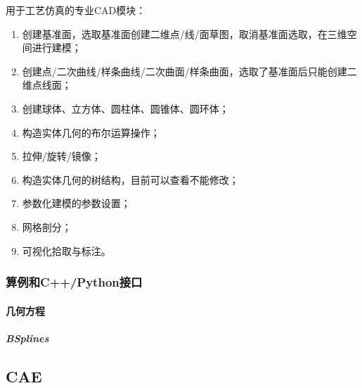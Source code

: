 \documentclass[letterpaper,10pt,english]{sphinxmanual}
\begin{document}
\sphinxAtStartPar
用于工艺仿真的专业CAD模块：
\begin{enumerate}
%
\item {} 
\sphinxAtStartPar
创建基准面，选取基准面创建二维点/线/面草图，取消基准面选取，在三维空间进行建模；

\item {} 
\sphinxAtStartPar
创建点/二次曲线/样条曲线/二次曲面/样条曲面，选取了基准面后只能创建二维点线面；

\item {} 
\sphinxAtStartPar
创建球体、立方体、圆柱体、圆锥体、圆环体；

\item {} 
\sphinxAtStartPar
构造实体几何的布尔运算操作；

\item {} 
\sphinxAtStartPar
拉伸/旋转/镜像；

\item {} 
\sphinxAtStartPar
构造实体几何的树结构，目前可以查看不能修改；

\item {} 
\sphinxAtStartPar
参数化建模的参数设置；

\item {} 
\sphinxAtStartPar
网格剖分；

\item {} 
\sphinxAtStartPar
可视化拾取与标注。

\end{enumerate}

\sphinxstepscope


\subsubsection{算例和C++/Python接口}
\label{\detokenize{src/fengsim/cad_example:c-python}}\label{\detokenize{src/fengsim/cad_example::doc}}

\paragraph{几何方程}
\label{\detokenize{src/fengsim/cad_example:id1}}

\subparagraph{B\sphinxhyphen{}Splines}
\label{\detokenize{src/fengsim/cad_example:b-splines}}
\sphinxstepscope


\subsection{CAE}
\label{\detokenize{src/fengsim/cae:cae}}\label{\detokenize{src/fengsim/cae::doc}}
\sphinxstepscope
\end{document}
